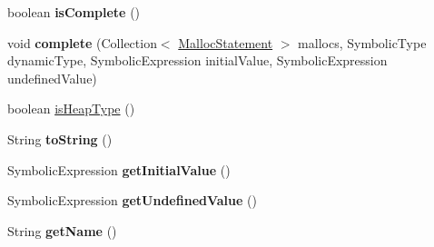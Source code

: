 \begin{DoxyCompactItemize}
\item 
\hypertarget{classedu_1_1udel_1_1cis_1_1vsl_1_1civl_1_1model_1_1common_1_1type_1_1CommonHeapType_a76bb0c4d8f6c18c4fb532c88d247427a}{}boolean {\bfseries is\+Complete} ()\label{classedu_1_1udel_1_1cis_1_1vsl_1_1civl_1_1model_1_1common_1_1type_1_1CommonHeapType_a76bb0c4d8f6c18c4fb532c88d247427a}

\item 
\hypertarget{classedu_1_1udel_1_1cis_1_1vsl_1_1civl_1_1model_1_1common_1_1type_1_1CommonHeapType_acfb047611b947afc9b1679eab372187f}{}void {\bfseries complete} (Collection$<$ \hyperlink{interfaceedu_1_1udel_1_1cis_1_1vsl_1_1civl_1_1model_1_1IF_1_1statement_1_1MallocStatement}{Malloc\+Statement} $>$ mallocs, Symbolic\+Type dynamic\+Type, Symbolic\+Expression initial\+Value, Symbolic\+Expression undefined\+Value)\label{classedu_1_1udel_1_1cis_1_1vsl_1_1civl_1_1model_1_1common_1_1type_1_1CommonHeapType_acfb047611b947afc9b1679eab372187f}

\item 
boolean \hyperlink{classedu_1_1udel_1_1cis_1_1vsl_1_1civl_1_1model_1_1common_1_1type_1_1CommonHeapType_a0d6a001c5b9a9b110955c76f549591ea}{is\+Heap\+Type} ()
\item 
\hypertarget{classedu_1_1udel_1_1cis_1_1vsl_1_1civl_1_1model_1_1common_1_1type_1_1CommonHeapType_a8dc03ad2018ed8a1d5aee1ffe5ddb096}{}String {\bfseries to\+String} ()\label{classedu_1_1udel_1_1cis_1_1vsl_1_1civl_1_1model_1_1common_1_1type_1_1CommonHeapType_a8dc03ad2018ed8a1d5aee1ffe5ddb096}

\item 
\hypertarget{classedu_1_1udel_1_1cis_1_1vsl_1_1civl_1_1model_1_1common_1_1type_1_1CommonHeapType_a0545c11aed3c92318ec02c65bfddab5d}{}Symbolic\+Expression {\bfseries get\+Initial\+Value} ()\label{classedu_1_1udel_1_1cis_1_1vsl_1_1civl_1_1model_1_1common_1_1type_1_1CommonHeapType_a0545c11aed3c92318ec02c65bfddab5d}

\item 
\hypertarget{classedu_1_1udel_1_1cis_1_1vsl_1_1civl_1_1model_1_1common_1_1type_1_1CommonHeapType_ab1d405d2b2f5b0e7d0742ede357b6572}{}Symbolic\+Expression {\bfseries get\+Undefined\+Value} ()\label{classedu_1_1udel_1_1cis_1_1vsl_1_1civl_1_1model_1_1common_1_1type_1_1CommonHeapType_ab1d405d2b2f5b0e7d0742ede357b6572}

\item 
\hypertarget{classedu_1_1udel_1_1cis_1_1vsl_1_1civl_1_1model_1_1common_1_1type_1_1CommonHeapType_ab4fe2316185430349018691971abaa29}{}String {\bfseries get\+Name} ()\label{classedu_1_1udel_1_1cis_1_1vsl_1_1civl_1_1model_1_1common_1_1type_1_1CommonHeapType_ab4fe2316185430349018691971abaa29}


\end{DoxyCompactItemize}
